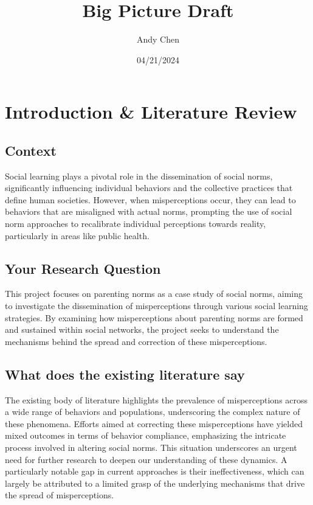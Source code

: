 \documentclass{article}
\title{Big Picture Draft}
\author{Andy Chen}
\date{04/21/2024}
\begin{document}
\maketitle
 


\section{Introduction \& Literature Review}

\subsection*{Context}
Social learning plays a pivotal role in the dissemination of social norms, significantly influencing individual behaviors and the collective practices that define human societies. However, when misperceptions occur, they can lead to behaviors that are misaligned with actual norms, prompting the use of social norm approaches to recalibrate individual perceptions towards reality, particularly in areas like public health.


\subsection*{Your Research Question}
This project focuses on parenting norms as a case study of social norms, aiming to investigate the dissemination of misperceptions through various social learning strategies. By examining how misperceptions about parenting norms are formed and sustained within social networks, the project seeks to understand the mechanisms behind the spread and correction of these misperceptions.

\subsection*{What does the existing literature say}
The existing body of literature highlights the prevalence of misperceptions across a wide range of behaviors and populations, underscoring the complex nature of these phenomena. Efforts aimed at correcting these misperceptions have yielded mixed outcomes in terms of behavior compliance, emphasizing the intricate process involved in altering social norms. This situation underscores an urgent need for further research to deepen our understanding of these dynamics. A particularly notable gap in current approaches is their ineffectiveness, which can largely be attributed to a limited grasp of the underlying mechanisms that drive the spread of misperceptions.
\end{document}
